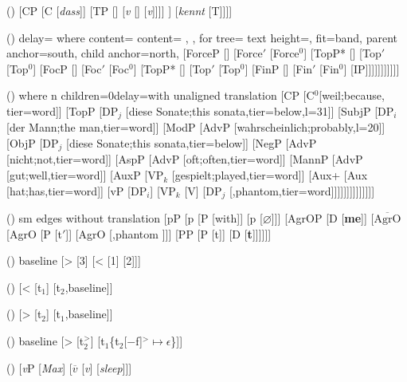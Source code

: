 \begin {forest}()
 [CP [C [\emph {dass}]] [TP [\vP [\emph {diesen Mann}] [\littlevbar [ \emph {jeder}] [\littlevbar [VP [\phonliste { diesen Mann } {[D]}] [\phonliste { kennt }]] [\textit {v} [] [\textit {v}]]]] ] [\textit {kennt} {[T]}]]] \end {forest}
\begin {forest}()
 delay={ where content={}{ content={\phantom {X}} }{}, }, for tree={ text height=\mytextheight , fit=band, parent anchor=south, child anchor=north, } [ForceP [] [Force$'$ [Force$^0$] [TopP* [] [Top$'$ [Top$^0$] [FocP [] [Foc$'$ [Foc$^0$] [TopP* [] [Top$'$ [Top$^0$] [FinP [] [Fin$'$ [Fin$^0$] [IP]]]]]]]]]]] \end {forest}
\begin {forest}()
 where n children=0{delay=with unaligned translation}{} [CP [C$^0$[weil;because, tier=word]] [TopP [DP$_j$ [diese Sonate;this sonata,tier=below,l=31\baselineskip ]] [SubjP [DP$_i$ [der Mann;the man,tier=word]] [ModP [AdvP [wahrscheinlich;probably,l=20\baselineskip ]] [ObjP [DP$_j$ [diese Sonate;this sonata,tier=below]] [NegP [AdvP [nicht;not,tier=word]] [AspP [AdvP [oft;often,tier=word]] [MannP [AdvP [gut;well,tier=word]] [AuxP [VP$_k$ [gespielt;played,tier=word]] [Aux+ [Aux [hat;has,tier=word]] [vP [DP$_i$] [VP$_k$ [V] [DP$_j$ [,phantom,tier=word]]]]]]]]]]]]]] \end {forest}
\begin {forest}()
 sm edges without translation [pP [p [P [with]] [p [$\varnothing $]]] [AgrOP [D [\textbf {me}]] [$\overline {\mbox {AgrO}}$ [AgrO [P [t$'$]] [AgrO [,phantom ]]] [PP [P [t]] [D [\textbf {t}]]]]]] \end {forest}
\begin {forest}()
 baseline [> [3] [< [1] [2]]] \end {forest}
\begin {forest}()
 [< [t\ensuremath {_1}] [t\ensuremath {_2},baseline]] \end {forest}
\begin {forest}()
 [> [t\ensuremath {_2}] [t\ensuremath {_1},baseline]] \end {forest}
\begin {forest}()
 baseline [> [t$_2^>$] [{{t$_1$}\{t$_2$[$-$f]$^> \mapsto \epsilon $\}}]] \end {forest}
\begin {forest}()
 [\emph {v}P [\emph {Max}] [{$\overline {v}$} [\textit {v}] [\emph {sleep}]]] \end {forest}
